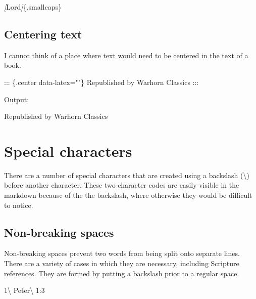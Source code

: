 \documentclass[
]{book}
\newenvironment{Shaded}{\begin{snugshade}}{\end{snugshade}}
\newcommand{\CommentTok}[1]{\textcolor[rgb]{0.56,0.35,0.01}{\textit{#1}}}
\newcommand{\NormalTok}[1]{#1}
\newcommand{\OtherTok}[1]{\textcolor[rgb]{0.56,0.35,0.01}{#1}}
\begin{document}
\begin{Shaded}
\begin{Highlighting}[]
\CommentTok{[}\OtherTok{Lord}\CommentTok{]}\NormalTok{\{.smallcaps\}}
\end{Highlighting}
\end{Shaded}

\hypertarget{centering-text}{%
\section{Centering text}\label{centering-text}}

I cannot think of a place where text would need to be centered in the text of a book.

\begin{Shaded}
\begin{Highlighting}[]
\NormalTok{::: \{.center data{-}latex=""\}}
\NormalTok{Republished by Warhorn Classics}
\NormalTok{:::}
\end{Highlighting}
\end{Shaded}

Output:

\begin{center}
Republished by Warhorn Classics

\end{center}

\hypertarget{special-characters}{%
\chapter{Special characters}\label{special-characters}}

There are a number of special characters that are created using a backslash (\textbackslash) before another character. These two-character codes are easily visible in the markdown because of the the backslash, where otherwise they would be difficult to notice.

\hypertarget{non-breaking-spaces}{%
\section{Non-breaking spaces}\label{non-breaking-spaces}}

Non-breaking spaces prevent two words from being split onto separate lines. There are a variety of cases in which they are necessary, including Scripture references. They are formed by putting a backslash prior to a regular space.

\begin{Shaded}
\begin{Highlighting}[]
\NormalTok{1\textbackslash{} Peter\textbackslash{} 1:3 }
\end{Highlighting}
\end{Shaded}
\end{document}
